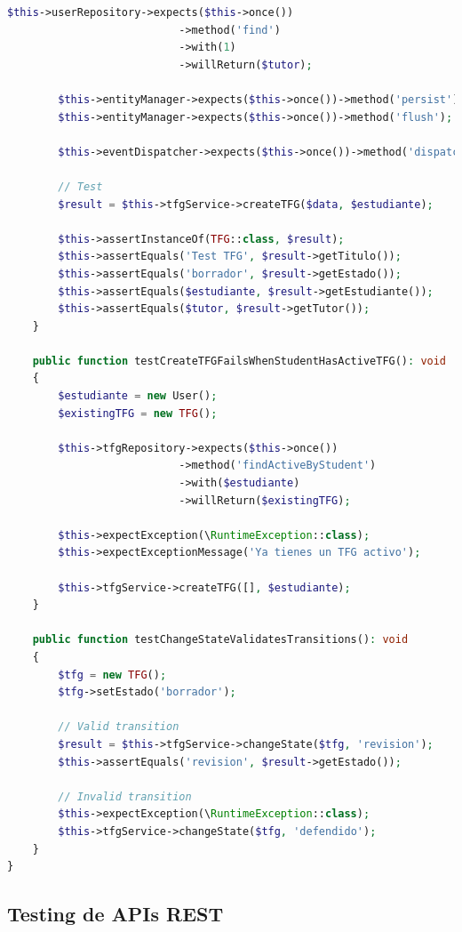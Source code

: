 \documentclass[12pt,a4paper,oneside]{report}
\begin{document}
\begin{lstlisting}[language=PHP]
        $this->userRepository->expects($this->once())
                           ->method('find')
                           ->with(1)
                           ->willReturn($tutor);

        $this->entityManager->expects($this->once())->method('persist');
        $this->entityManager->expects($this->once())->method('flush');

        $this->eventDispatcher->expects($this->once())->method('dispatch');

        // Test
        $result = $this->tfgService->createTFG($data, $estudiante);

        $this->assertInstanceOf(TFG::class, $result);
        $this->assertEquals('Test TFG', $result->getTitulo());
        $this->assertEquals('borrador', $result->getEstado());
        $this->assertEquals($estudiante, $result->getEstudiante());
        $this->assertEquals($tutor, $result->getTutor());
    }

    public function testCreateTFGFailsWhenStudentHasActiveTFG(): void
    {
        $estudiante = new User();
        $existingTFG = new TFG();

        $this->tfgRepository->expects($this->once())
                           ->method('findActiveByStudent')
                           ->with($estudiante)
                           ->willReturn($existingTFG);

        $this->expectException(\RuntimeException::class);
        $this->expectExceptionMessage('Ya tienes un TFG activo');

        $this->tfgService->createTFG([], $estudiante);
    }

    public function testChangeStateValidatesTransitions(): void
    {
        $tfg = new TFG();
        $tfg->setEstado('borrador');

        // Valid transition
        $result = $this->tfgService->changeState($tfg, 'revision');
        $this->assertEquals('revision', $result->getEstado());

        // Invalid transition
        $this->expectException(\RuntimeException::class);
        $this->tfgService->changeState($tfg, 'defendido');
    }
}
\end{lstlisting}

\subsection{Testing de APIs REST}\label{testing-de-apis-rest}
\end{document}
